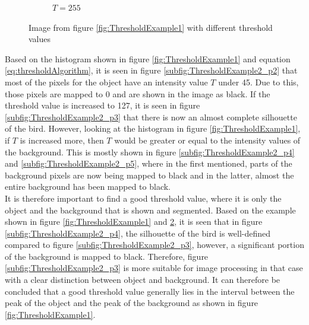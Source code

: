 \begin{figure}[H]
\begin{subfigure}[b]{0.3\textwidth}
         \caption{$T = 255$}
         \label{subfig:ThresholdExample2_p6}
     \end{subfigure}
    \caption{Image from figure \ref{fig:ThresholdExample1} with different threshold values}
    \label{fig:ThresholdExample2}
\end{figure}

Based on the histogram shown in figure \ref{fig:ThresholdExample1} and equation \ref{eq:thresholdAlgorithm}, it is seen in figure \ref{subfig:ThresholdExample2_p2} that most of the pixels for the object have an intensity value $T$ under 45. Due to this, those pixels are mapped to 0 and are shown in the image as black. If the threshold value is increased to 127, it is seen in figure \ref{subfig:ThresholdExample2_p3} that there is now an almost complete silhouette of the bird. However, looking at the histogram in figure \ref{fig:ThresholdExample1}, if $T$ is increased more, then $T$ would be greater or equal to the intensity values of the background. This is mostly shown in figure \ref{subfig:ThresholdExample2_p4} and \ref{subfig:ThresholdExample2_p5}, where in the first mentioned, parts of the background pixels are now being mapped to black and in the latter, almost the entire background has been mapped to black. \\

It is therefore important to find a good threshold value, where it is only the object and the background that is shown and segmented. Based on the example shown in figure \ref{fig:ThresholdExample1} and \ref{fig:ThresholdExample2}, it is seen that in figure \ref{subfig:ThresholdExample2_p4}, the silhouette of the bird is well-defined compared to figure \ref{subfig:ThresholdExample2_p3}, however, a significant portion of the background is mapped to black. Therefore, figure \ref{subfig:ThresholdExample2_p3} is more suitable for image processing in that case with a clear distinction between object and background. It can therefore be concluded that a good threshold value generally lies in the interval between the peak of the object and the peak of the background as shown in figure \ref{fig:ThresholdExample1}. \\


